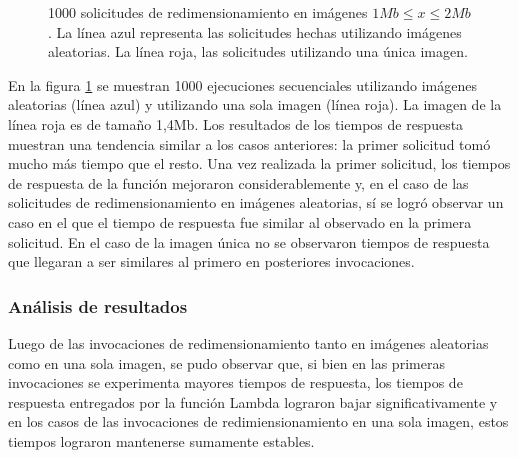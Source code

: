 \begin{figure}[h]
\hspace{-1.5cm}
\caption{1000 solicitudes de redimensionamiento en imágenes $1Mb \leq x \leq 2Mb$. La línea azul representa las solicitudes hechas utilizando imágenes aleatorias. La línea roja, las solicitudes utilizando una única imagen.}
\label{fig:1000-ejecuciones-secuenciales-2mb}
\end{figure}

En la figura \ref{fig:1000-ejecuciones-secuenciales-2mb} se muestran 1000 ejecuciones secuenciales utilizando imágenes aleatorias (línea azul) y utilizando una sola imagen (línea roja). La imagen de la línea roja es de tamaño 1,4Mb. Los resultados de los tiempos de respuesta muestran una tendencia similar a los casos anteriores: la primer solicitud tomó mucho más tiempo que el resto. Una vez realizada la primer solicitud, los tiempos de respuesta de la función mejoraron considerablemente y, en el caso de las solicitudes de redimensionamiento en imágenes aleatorias, sí se logró observar un caso en el que el tiempo de respuesta fue similar al observado en la primera solicitud. En el caso de la imagen única no se observaron tiempos de respuesta que llegaran a ser similares al primero en posteriores invocaciones. 

\subsubsection{Análisis de resultados}
Luego de las invocaciones de redimensionamiento tanto en imágenes aleatorias como en una sola imagen, se pudo observar que, si bien en las primeras invocaciones se experimenta mayores tiempos de respuesta, los tiempos de respuesta entregados por la función Lambda lograron bajar significativamente y en los casos de las invocaciones de redimiensionamiento en una sola imagen, estos tiempos lograron mantenerse sumamente estables.

